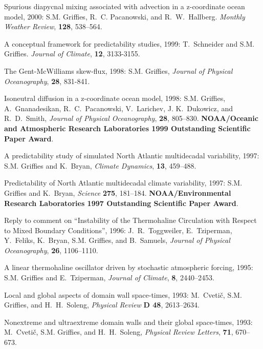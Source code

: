 \begin{etaremune}
\item Spurious diapycnal mixing associated with advection in a z-coordinate ocean model, 2000: S.M. Grif\/f\/ies, R.\ C. Pacanowski, and R.\ W.\ Hallberg. {\em Monthly Weather Review}, {\bf
128}, 538--564.

\item A conceptual framework for predictability studies, 1999: T.\ 
Schneider and S.M. Grif\/f\/ies.  {\em Journal of Climate},
{\bf 12}, 3133-3155.
  
\item The Gent-McWilliams skew-flux, 1998:
S.M. Grif\/f\/ies, {\em Journal of Physical Oceanography}, {\bf 28}, 831-841.
  
\item Isoneutral diffusion in a z-coordinate ocean model, 1998: S.M. Grif\/f\/ies, A.\ Gnanadesikan, R.\ C.\ Pacanowski, V.\
  Larichev, J. K.\ Dukowicz, and R.\ D.\ Smith, {\em Journal of
    Physical Oceanography}, {\bf 28}, 805--830.  {\bf
    NOAA/Oceanic and Atmospheric Research Laboratories 1999
    Outstanding Scientific Paper Award}.
  
\item A predictability study of simulated North Atlantic multidecadal
variability, 1997: S.M. Grif\/f\/ies and K.\ Bryan, {\em
Climate Dynamics}, {\bf 13}, 459--488.
  
\item Predictability of North Atlantic multidecadal climate
  variability, 1997: S.M. Grif\/f\/ies and K.\ Bryan, {\em
    Science} {\bf 275}, 181--184. {\bf NOAA/Environmental
    Research Laboratories 1997 Outstanding Scientific Paper Award}.
 
\item Reply to comment on ``Instability of the Thermohaline
Circulation with Respect to Mixed Boundary Conditions'', 1996: J.\ R.\
Toggweiler, E.\ Tziperman, Y.\ Feliks, K.\ Bryan, S.M. Grif\/f\/ies, and B.\ Samuels, {\em Journal of Physical
Oceanography}, {\bf 26}, 1106--1110.
  
\item A linear thermohaline oscillator driven by stochastic
atmospheric forcing, 1995: S.M. Grif\/f\/ies and E.\ Tziperman,
{\em Journal of Climate}, {\bf 8}, 2440--2453.

\item Local and global aspects of domain wall space-times, 1993: M.\
Cveti\v c, S.M. Grif\/f\/ies, and H.\ H.\ Soleng, {\em Physical
Review} {\bf D 48}, 2613--2634.

\item Nonextreme and ultraextreme domain walls and their global
space-times, 1993: M.\ Cveti\v c, S.M. Grif\/f\/ies, and H.\
H.\ Soleng, {\em Physical Review Letters}, {\bf 71}, 670--673.


\end{etaremune}
